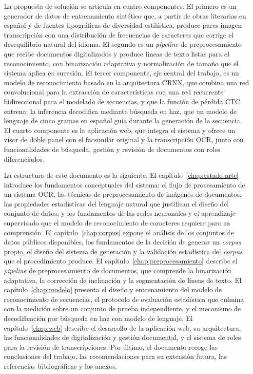 La propuesta de solución se articula en cuatro componentes. El primero es un generador de datos de entrenamiento sintético que, a partir de obras literarias en español y de fuentes tipográficas de diversidad estilística, produce pares imagen--transcripción con una distribución de frecuencias de caracteres que corrige el desequilibrio natural del idioma. El segundo es un \textit{pipeline} de preprocesamiento que recibe documentos digitalizados y produce líneas de texto listas para el reconocimiento, con binarización adaptativa y normalización de tamaño que el sistema aplica en sucesión. El tercer componente, eje central del trabajo, es un modelo de reconocimiento basado en la arquitectura CRNN, que combina una red convolucional para la extracción de características con una red recurrente bidireccional para el modelado de secuencias, y que la función de pérdida CTC entrena; la inferencia decodifica mediante búsqueda en haz, que un modelo de lenguaje de cinco gramas en español guía durante la generación de la secuencia. El cuarto componente es la aplicación web, que integra el sistema y ofrece un visor de doble panel con el facsimilar original y la transcripción OCR, junto con funcionalidades de búsqueda, gestión y revisión de documentos con roles diferenciados.

La estructura de este documento es la siguiente. El capítulo~\ref{chap:estado-arte} introduce los fundamentos conceptuales del sistema: el flujo de procesamiento de un sistema OCR, las técnicas de preprocesamiento de imágenes de documentos, las propiedades estadísticas del lenguaje natural que justifican el diseño del conjunto de datos, y los fundamentos de las redes neuronales y el aprendizaje supervisado que el modelo de reconocimiento de caracteres requiere para su comprensión. El capítulo~\ref{chap:corpus} expone el análisis de los conjuntos de datos públicos disponibles, los fundamentos de la decisión de generar un \textit{corpus} propio, el diseño del sistema de generación y la validación estadística del \textit{corpus} que el procedimiento produce. El capítulo~\ref{chap:preprocesamiento} describe el \textit{pipeline} de preprocesamiento de documentos, que comprende la binarización adaptativa, la corrección de inclinación y la segmentación de líneas de texto. El capítulo~\ref{chap:modelo} presenta el diseño y entrenamiento del modelo de reconocimiento de secuencias, el protocolo de evaluación estadística que culmina con la medición sobre un conjunto de prueba independiente, y el mecanismo de decodificación por búsqueda en haz con modelo de lenguaje. El capítulo~\ref{chap:web} describe el desarrollo de la aplicación web, su arquitectura, las funcionalidades de digitalización y gestión documental, y el sistema de roles para la revisión de transcripciones. Por último, el documento recoge las conclusiones del trabajo, las recomendaciones para su extensión futura, las referencias bibliográficas y los anexos.

